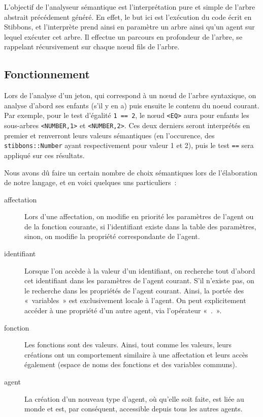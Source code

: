 L'objectif de l'analyseur sémantique est l'interprétation pure et simple de l'arbre abstrait précédement généré. En effet, le but ici est l'exécution du code écrit en Stibbons, et l'interprète prend ainsi en paramètre un arbre ainsi qu'un agent sur lequel exécuter cet arbre. Il effectue un parcours en profondeur de l'arbre, se rappelant récursivement sur chaque nœud fils de l'arbre. 

\subsection{Fonctionnement}
Lors de l'analyse d'un jeton, qui correspond à un nœud de l'arbre syntaxique, on analyse d'abord ses enfants (s'il y en a) puis ensuite le contenu du noeud courant.
Par exemple, pour le test d'égalité \verb|1 == 2|, le nœud \verb|<EQ>| aura pour enfants les sous-arbres \verb|<NUMBER,1>| et \verb|<NUMBER,2>|. Ces deux derniers seront interprétés en premier et renverront leurs valeurs sémantiques (en l'occurence, des \verb|stibbons::Number| ayant respectivement pour valeur 1 et 2), puis le test \verb|==| sera appliqué sur ces résultats.

Nous avons dû faire un certain nombre de choix sémantiques lors de l'élaboration de notre langage, et en voici quelques uns particuliers~:
\begin{description}
\item[affectation] Lors d'une affectation, on modifie en priorité les paramètres de l'agent ou de la fonction courante, si l'identifiant existe dans la table des paramètres, sinon, on modifie la propriété correspondante de l'agent.
\item[identifiant] Lorsque l'on accède à la valeur d'un identifiant, on recherche tout d'abord cet identifiant dans les paramètres de l'agent courant. S'il n'existe pas, on le recherche dans les propriétés de l'agent courant. Ainsi, la portée des «~variables~» est exclusivement locale à l'agent. On peut explicitement accéder à une propriété d'un autre agent, via l'opérateur «~.~».
\item[fonction] Les fonctions sont des valeurs. Ainsi, tout comme les valeurs, leurs créations ont un comportement similaire à une affectation et leurs accès également (espace de noms des fonctions et des variables communs).
\item[agent] La création d'un nouveau type d'agent, où qu'elle soit faite, est liée au monde et est, par conséquent, accessible depuis tous les autres agents.
\end{description}


